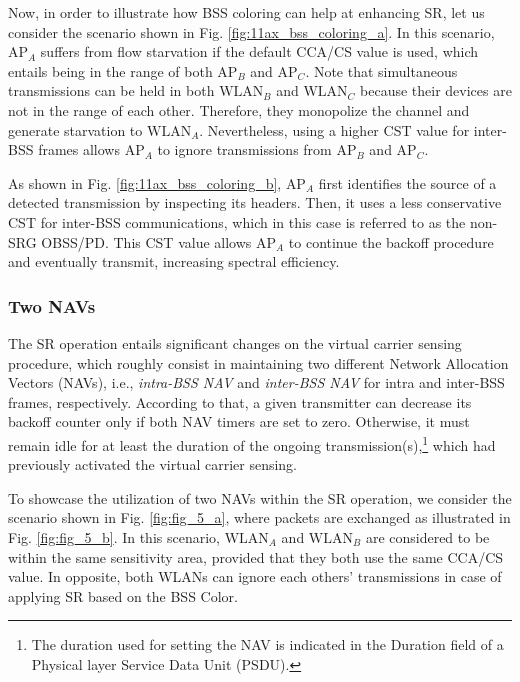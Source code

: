 \documentclass[comsoc]{IEEEtran}
\begin{document}
	Now, in order to illustrate how BSS coloring can help at enhancing SR, let us consider the scenario shown in Fig. \ref{fig:11ax_bss_coloring_a}. In this scenario, $\text{AP}_{A}$ suffers from flow starvation if the default CCA/CS value is used, which entails being in the range of both $\text{AP}_B$ and $\text{AP}_C$. Note that simultaneous transmissions can be held in both $\text{WLAN}_B$ and $\text{WLAN}_C$ because their devices are not in the range of each other. Therefore, they monopolize the channel and generate starvation to $\text{WLAN}_A$. Nevertheless, using a higher CST value for inter-BSS frames allows $\text{AP}_{A}$ to ignore transmissions from $\text{AP}_B$ and $\text{AP}_C$. 
	
	As shown in Fig. \ref{fig:11ax_bss_coloring_b}, $\text{AP}_A$ first identifies the source of a detected transmission by inspecting its headers. Then, it uses a less conservative CST for inter-BSS communications, which in this case is referred to as the non-SRG OBSS/PD. This CST value allows $\text{AP}_A$ to continue the backoff procedure and eventually transmit, increasing spectral efficiency.
	
	\subsubsection{Two NAVs}
	\label{section:two_navs}
	The SR operation entails significant changes on the virtual carrier sensing procedure, which roughly consist in maintaining two different Network Allocation Vectors (NAVs), i.e., \emph{intra-BSS NAV} and \emph{inter-BSS NAV} for intra and inter-BSS frames, respectively. According to that, a given transmitter can decrease its backoff counter only if both NAV timers are set to zero. Otherwise, it must remain idle for at least the duration of the ongoing transmission(s),\footnote{The duration used for setting the NAV is indicated in the Duration field of a Physical layer Service Data Unit (PSDU).} which had previously activated the virtual carrier sensing. 
	
	To showcase the utilization of two NAVs within the SR operation, we consider the scenario shown in Fig. \ref{fig:fig_5_a}, where packets are exchanged as illustrated in Fig. \ref{fig:fig_5_b}. In this scenario, $\text{WLAN}_A$ and $\text{WLAN}_B$ are considered to be within the same sensitivity area, provided that they both use the same CCA/CS value. In opposite, both WLANs can ignore each others' transmissions in case of applying SR based on the BSS Color.
	
\end{document}
